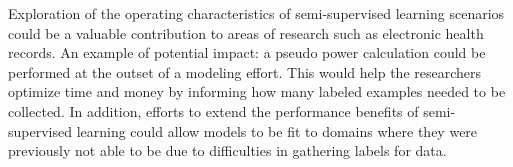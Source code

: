 \documentclass[]{book}
\theoremstyle{definition}
\theoremstyle{definition}
\theoremstyle{definition}
\theoremstyle{remark}
\begin{document}
Exploration of the operating characteristics of semi-supervised learning
scenarios could be a valuable contribution to areas of research such as
electronic health records. An example of potential impact: a pseudo
power calculation could be performed at the outset of a modeling effort.
This would help the researchers optimize time and money by informing how
many labeled examples needed to be collected. In addition, efforts to
extend the performance benefits of semi-supervised learning could allow
models to be fit to domains where they were previously not able to be
due to difficulties in gathering labels for data.


\end{document}
